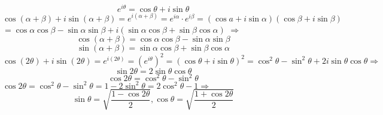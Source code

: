 \begin{equation}
{e^{i\theta }} = \cos \theta  + i\sin \theta 
\end{equation}
$
\cos \left( {\alpha  + \beta } \right) + i\sin \left( {\alpha  + \beta } \right) = {e^{i\left( {\alpha  + \beta } \right)}} = {e^{i\alpha }} \cdot {e^{i\beta }} = \left( {\cos a + i\sin \alpha } \right)\left( {\cos \beta  + i\sin \beta } \right)
$
$= \cos \alpha \cos \beta  - \sin \alpha \sin \beta  + i\left( {\sin \alpha \cos \beta  + \sin \beta \cos \alpha } \right)
$
$\Rightarrow$
\begin{equation}
\cos \left( {\alpha  + \beta } \right) = \cos \alpha \cos \beta  - \sin \alpha \sin \beta
\end{equation}
\begin{equation}
\sin \left( {\alpha  + \beta } \right) = \sin \alpha \cos \beta  + \sin \beta \cos \alpha
\end{equation}
$
\cos \left( {2\theta } \right) + i\sin \left( {2\theta } \right) = {e^{i\left( {2\theta } \right)}} = {\left( {{e^{i\theta }}} \right)^2} = {\left( {\cos \theta  + i\sin \theta } \right)^2} = {\cos ^2}\theta  - {\sin ^2}\theta  + 2i\sin \theta \cos \theta \Rightarrow
$
\begin{equation}
\sin 2\theta  = 2\sin \theta \cos \theta 
\end{equation}
\begin{equation}
\cos 2\theta  = {\cos ^2}\theta  - {\sin ^2}\theta
\end{equation}
$\cos 2\theta  = {\cos ^2}\theta  - {\sin ^2}\theta  = 1 - 2{\sin ^2}\theta  = 2{\cos ^2}\theta  - 1\Rightarrow$
\begin{equation}
\sin \theta  = \sqrt {\frac{{1 - \cos 2\theta }}{2}} ,\cos \theta  = \sqrt {\frac{{1 + \cos 2\theta }}{2}}
\end{equation}